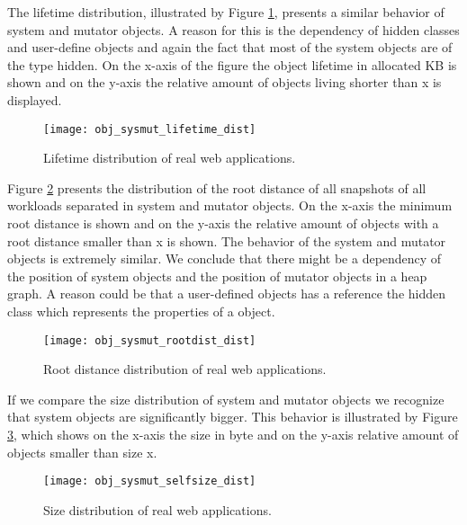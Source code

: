 The lifetime distribution, illustrated by Figure \ref{fig:obj_sysmut_lieftiem_dist}, presents a similar behavior of system and mutator objects. A reason for this is the dependency of hidden classes and user-define objects and again the fact that most of the system objects are of the type hidden. On the x-axis of the figure the object lifetime in allocated KB is shown and on the y-axis the relative amount of objects living shorter than x is displayed. 
\begin{figure}
	\centering
	\texttt{[image: obj\_sysmut\_lifetime\_dist]}
	\caption{Lifetime distribution of real web applications.}
	\label{fig:obj_sysmut_lieftiem_dist}
\end{figure}

Figure \ref{fig:obj_sysmut_rootdist_dist} presents the distribution of the root distance of all snapshots of all workloads separated in system and mutator objects. On the x-axis the minimum root distance is shown and on the y-axis the relative amount of objects with a root distance smaller than x is shown. The behavior of the system and mutator objects is extremely similar. We conclude that there might be a dependency of the position of system objects and the position of mutator objects in a heap graph. A reason could be that a user-defined objects has a reference the hidden class which represents the properties of a object.  
\begin{figure}
	\centering
	\texttt{[image: obj\_sysmut\_rootdist\_dist]}
	\caption{Root distance distribution of real web applications.}
	\label{fig:obj_sysmut_rootdist_dist}
\end{figure}

If we compare the size distribution of system and mutator objects we recognize that system objects are significantly bigger. This behavior is illustrated by Figure \ref{fig:obj_sysmut_selfsize_dist}, which shows on the x-axis the size in byte and on the y-axis relative amount of objects smaller than size x.
\begin{figure}
	\centering
	\texttt{[image: obj\_sysmut\_selfsize\_dist]}
	\caption{Size distribution of real web applications.}
	\label{fig:obj_sysmut_selfsize_dist}
\end{figure}